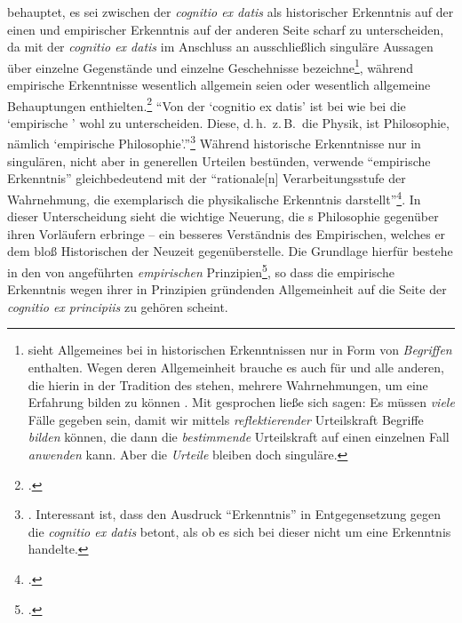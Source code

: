 behauptet, es sei zwischen der \emph{cognitio ex datis} als historischer
Erkenntnis auf der einen und empirischer Erkenntnis auf der anderen Seite scharf
zu unterscheiden, da  mit der \emph{cognitio ex datis} im
Anschluss an  ausschließlich singuläre
Aussagen über einzelne Gegenstände und einzelne Geschehnisse
bezeichne\footnote{
sieht Allgemeines bei
 in
historischen Erkenntnissen nur in Form von \emph{Begriffen} enthalten. Wegen
deren Allgemeinheit brauche es auch für
 und alle anderen, die hierin in der
Tradition des  stehen, mehrere Wahrnehmungen, um eine
Erfahrung bilden zu können
\parencite[Vgl.][55--57]{Kambartel:ErfahrungundStruktur1968}. Mit
 gesprochen ließe sich sagen: Es müssen \emph{viele} Fälle
gegeben sein, damit wir mittels \textit{reflektierender} Urteilskraft Begriffe
\emph{bilden} können, die dann die \textit{bestimmende} Urteilskraft auf einen
einzelnen Fall \emph{anwenden} kann. Aber die \emph{Urteile} bleiben doch
singuläre.}, während empirische Erkenntnisse wesentlich allgemein seien oder
wesentlich allgemeine Behauptungen enthielten.\footnote{\cite[Vgl.][54--58, 85,
99]{Kambartel:ErfahrungundStruktur1968}.} \enquote{Von der \enquote{cognitio ex
datis} ist bei  wie bei 
die \enquote{empirische } wohl zu unterscheiden.
Diese, d.\,h.\ z.\,B.\ die Physik, ist Philosophie, nämlich \enquote{empirische
Philosophie}.}\footnote{\Cite[][85]{Kambartel:ErfahrungundStruktur1968}.
Interessant ist, dass  den
Ausdruck \enquote{Erkenntnis} in Entgegensetzung gegen die \emph{cognitio ex
datis} betont, als ob es sich bei dieser nicht um eine Erkenntnis
handelte.} Während historische Erkenntnisse nur in singulären, nicht aber in
generellen Urteilen bestünden, verwende 
\enquote{empirische Erkenntnis} gleichbedeutend mit der \enquote{rationale[n]
Verarbeitungsstufe der Wahrnehmung, die exemplarisch die physikalische
Erkenntnis
darstellt}\footnote{\Cite[][99]{Kambartel:ErfahrungundStruktur1968}.}.
In dieser Unterscheidung sieht  die wichtige Neuerung, die
s Philosophie gegenüber ihren Vorläufern erbringe -- ein
besseres Verständnis des Empirischen, welches er dem bloß Historischen der
Neuzeit gegenüberstelle. Die Grundlage hierfür bestehe in den von
 angeführten \emph{empirischen}
Prinzipien\footnote{\cite[Vgl.][85]{Kambartel:ErfahrungundStruktur1968}.}, so
dass die empirische Erkenntnis wegen ihrer in Prinzipien gründenden
Allgemeinheit auf die Seite der \emph{cognitio ex principiis} zu gehören scheint.

